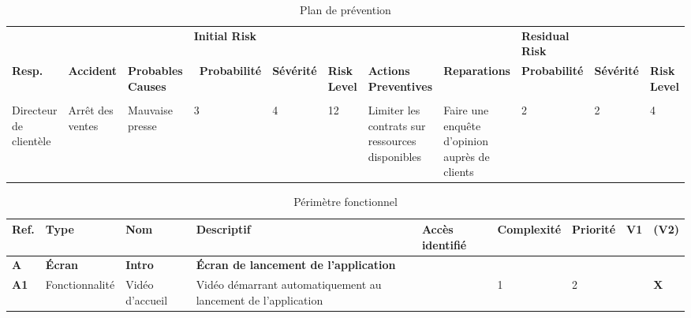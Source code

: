 \documentclass[12pt]{article}
\begin{document}
\begin{landscape}
\begin{table}[H]
\scriptsize
\caption{Plan de prévention}
\begin{tabular}{p{1cm} p{2cm} p{2cm} p{1.5cm} p{1cm}p{1cm}p{4cm}p{3.3cm} p{1.3cm}p{1cm} p{1cm}}
\hline & & & \bf Initial Risk & & & &&\bf Residual Risk & & \\ [5pt]
 \bf Resp.  & \bf Accident & \bf Probables Causes & \ \bf Probabilité & \bf Sévérité & \bf Risk Level & \bf Actions Preventives& \bf Reparations & \bf Probabilité &\bf Sévérité & \bf Risk Level \\
\hline
&&&&&&&&&&\\
 Directeur de clientèle  & Arrêt des ventes & Mauvaise presse & 3 & 4 & \cellcolor{red!50} 12 & Limiter les contrats sur ressources disponibles & Faire une enquête d’opinion auprès de clients & 2& 2& \cellcolor{green!50} 4 \\ 
\hline
\end{tabular}
\end{table}
\end{landscape}

\begin{landscape}
\begin{table}[H]
\scriptsize
\caption{Périmètre fonctionnel}
\begin{tabular}{p{1cm}p{2cm}p{3cm}p{10cm}p{1.75cm}p{1.5cm}p{1.25cm}p{.5cm}p{.5cm}}
\hline  Ref.	\cellcolor{gray!25}&Type \cellcolor{gray!25}& Nom\cellcolor{gray!25}& Descriptif \cellcolor{gray!25}& \bf Accès identifié \cellcolor{gray!25} & \bf Complexité \cellcolor{gray!25} & \bf Priorité \cellcolor{gray!25} & \bf V1 \cellcolor{gray!25} & \bf (V2) \cellcolor{gray!25}\\
\hline  	\bf A\cellcolor{gray!50}& \bf Écran\cellcolor{gray!50}& \bf Intro\cellcolor{gray!50}& \bf Écran de lancement de l’application\cellcolor{gray!50}& \cellcolor{gray!50} & \cellcolor{gray!50} &  \cellcolor{gray!50} & \cellcolor{gray!50} &  \cellcolor{gray!50}\\
\hline  	\bf A1& Fonctionnalité & Vidéo d’accueil & Vidéo démarrant automatiquement au lancement de l’application &  & 1 &  2 &  & \bf X\\



\hline
\end{tabular}
\end{table}
\end{landscape}
\end{document}
